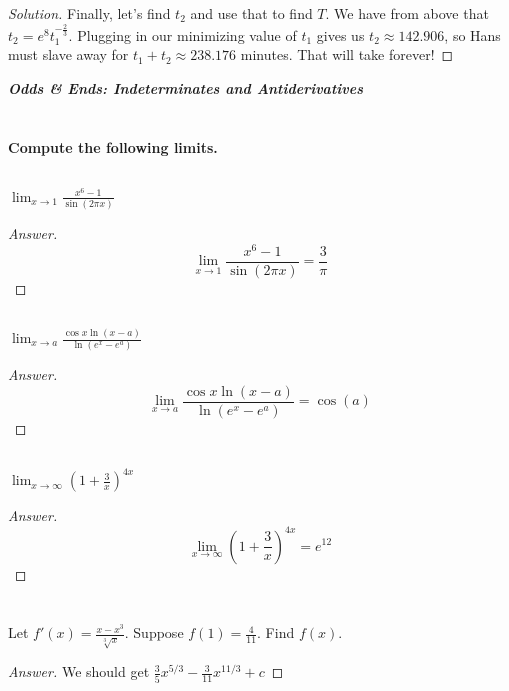 \documentclass[english,fleqn]{article}
\newcommand{\prob}[1]{\setcounter{section}{#1-1}\section{}}
\newcommand{\prt}[1]{\setcounter{subsection}{#1-1}\subsection{}}
\theoremstyle{remark}
\theoremstyle{definition}
\newcommand{\ild}[1]{\displaystyle{#1}}
\begin{document}
\begin{proof}[Solution]
	Finally, let's find $t_2$ and use that to find $T$. We have from above that $t_2=e^8t_1^{-\frac{2}{3}}$. Plugging in our minimizing value of $t_1$ gives us $t_2\approx 142.906$, so Hans must slave away for $t_1+t_2\approx 238.176$ minutes. That will take forever!
\end{proof}
	\newpage

	\begin{center}{\Large\textbf{\emph{Odds \& Ends: Indeterminates and Antiderivatives}}}\end{center}
	\prob{12} \textbf{Compute the following limits.}
	\prt{1}$\ild{\lim_{x\to 1}\frac{x^6-1}{\sin(2\pi x)}}$%
	\begin{proof}[Answer]
		\[\lim_{x\to 1}\frac{x^6-1}{\sin(2\pi x)}=\frac{3}{\pi}\]
	\end{proof}
	\prt{2}$\ild{\lim_{x\to a}\frac{\cos x \ln (x-a)}{\ln(e^x-e^a)}}$%
	\begin{proof}[Answer]
		\[\lim_{x\to a}\frac{\cos x \ln (x-a)}{\ln (e^x-e^a)}=\cos(a)\]
	\end{proof}
	\prt{3} $\ild{\lim_{x\to \infty} \left(1+\frac{3}{x}\right)^{4x}}$%
\begin{proof}[Answer] \[\lim_{x\to \infty} \left(1+\frac{3}{x}\right)^{4x}=e^{12}\]
	\end{proof}
	\prob{13} Let $ f'(x)=\ild{\frac{x-x^3}{\sqrt[3]{x}}}$. Suppose $f(1)=\frac{4}{11}$. Find $f(x)$.
	
	\begin{proof}[Answer]
		We should get $\frac{3}{5}x^{5/3}-\frac{3}{11}x^{11/3}+c$
	\end{proof}
\end{document}
